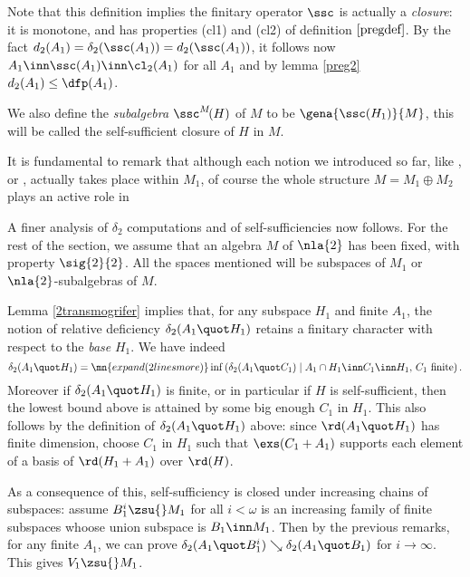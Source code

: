 Note that this definition implies the finitary operator $\ssc$ is actually a {\em closure}:
it is monotone, and has properties (cl1) and (cl2) of definition $\ref{pregdef}$.
By the fact $d_{2}(A_{1})=\delta_{2}(\ssc(A_{1}))=d_{2}(\ssc(A_{1}))$, it follows now 
$A_{1}\inn\ssc(A_{1})\inn\cl_{2}(A_{1})$ for all $A_{1}$ and by lemma \ref{preg2}
$d_{2}(A_{1})\leq\dfp(A_{1})$. 

We also define the {\em subalgebra} $\ssc^{M}\!(H)$ of $M$ to be $\gena{\ssc(H_{1})}{M}$,
this will be called the self-sufficient closure of $H$ in $M$.

It is fundamental to remark that although each notion we introduced so far, like {\em }, {\em } or {\em },
actually takes place within $M_{1}$, of course the whole structure $M=M_{1}\oplus M_{2}$ plays
an active role in

\medskip
A finer analysis of $\delta_{2}$ computations and of self-sufficiencies now follows.
For the rest of the section, we assume that an algebra
$M$ of $\nla{2}$ has been  fixed, with property $\sig{2}{2}$. All the spaces mentioned will be subspaces of $M_{1}$ or $\nla{2}$-subalgebras of
$M$.

Lemma \ref{2transmogrifer} implies that, for any subspace $H_{1}$ and finite $A_{1}$,
the notion of relative deficiency $\delta_{2}(A_{1}\quot H_{1})$ retains a finitary character
with respect to the {\em base} $H_{1}$. We have indeed
$$\delta_{2}(A_{1}\quot H_{1})=\mn{expand (2 lines more)}
\inf\left(\delta_{2}(A_{1}\quot C_{1})\mid A_{1}\cap H_{1}\inn C_{1}\inn H_{1},\, C_{1}\text{ finite}\right).$$
Moreover if $\delta_{2}(A_{1}\quot H_{1})$  is finite, or in particular if $H$ is self-sufficient, then
the lowest bound above is attained by some big enough $C_{1}$ in $H_{1}$. This also follows by the
definition of $\delta_{2}(A_{1}\quot H_{1})$ above: since $\rd(A_{1}\quot H_{1})$ has finite dimension,
choose $C_{1}$ in $H_{1}$ such that $\exs (C_{1}+A_{1})$ supports each element of a basis of
$\rd(H_{1}+A_{1})$ over $\rd(H)$.

As a  consequence of this, self-sufficiency is closed under increasing chains of subspaces: assume $B_{1}^{i}\zsu{} M_{1}$ for all $i<\omega$ is an increasing family of finite subspaces
whoose union subspace is $B_{1}\inn M_{1}$. Then by the previous remarks, for any finite $A_{1}$, we can prove $\delta_{2}(A_{1}\quot B_{1}^{i})\searrow\delta_{2}(A_{1}\quot B_{1})$ for $i\rightarrow\infty$.
This gives
$V_{1}\zsu{} M_{1}$.

